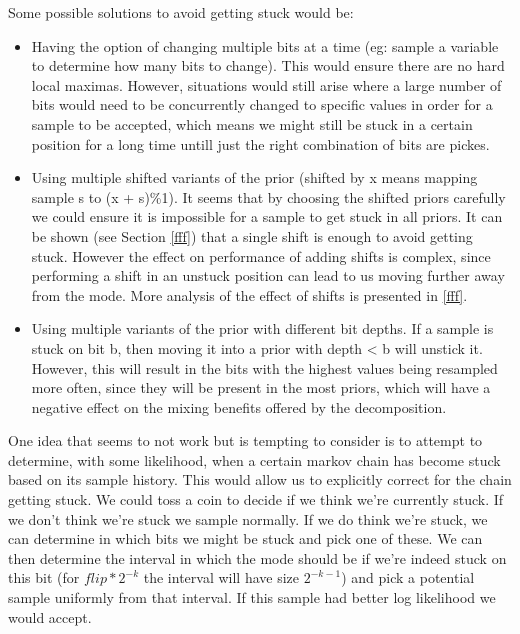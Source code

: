 Some possible solutions to avoid getting stuck would be:
\begin{itemize}

\item 
Having the option of changing multiple bits at a time (eg: sample a variable to determine how many bits to change). This would ensure there are no hard local maximas. However, situations would still arise where a large number of bits would need to be concurrently changed to specific values in order for a sample to be accepted, which means we might still be stuck in a certain position for a long time untill just the right combination of bits are pickes. 

\item
Using multiple shifted variants of the prior (shifted by x means mapping sample s to (x + s)\%1). It seems that by choosing the shifted priors carefully we could ensure it is impossible for a sample to get stuck in all priors. It can be shown (see Section \ref{fff}) that a single shift is enough to avoid getting stuck. However the effect on performance of adding shifts is complex, since performing a shift in an unstuck position can lead to us moving further away from the mode. More analysis of the effect of shifts is presented in \ref{fff}.

\item
Using multiple variants of the prior with different bit depths. If a sample is stuck on bit b, then moving it into a prior with depth < b will unstick it. However, this will result in the bits with the highest values being resampled more often, since they will be present in the most priors, which will have a negative effect on the mixing benefits offered by the decomposition.

\end{itemize}

One idea that seems to not work but is tempting to consider is to attempt to determine, with some likelihood, when a certain markov chain has become stuck based on its sample history. This would allow us to explicitly correct for the chain getting stuck. We could toss a coin to decide if we think we're currently stuck. If we don't think we're stuck we sample normally. If we do think we're stuck, we can determine in which bits we might be stuck and pick one of these. We can then determine the interval in which the mode should be if we're indeed stuck on this bit (for $flip*2^{-k}$ the interval will have size $2^{-k-1}$) and pick a potential sample uniformly from that interval. If this sample had better log likelihood we would accept. 

